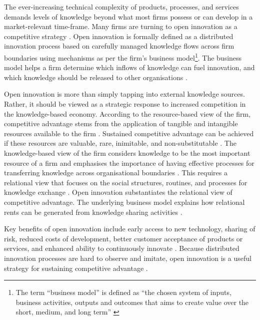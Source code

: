 The ever-increasing technical complexity of products, processes, and services demands levels of knowledge beyond what most firms possess or can develop in a market-relevant time-frame. Many firms are turning to open innovation as a competitive strategy \citep{enkel2009open,bessant2013innovation}. Open innovation is formally defined as a distributed innovation process based on carefully managed knowledge flows across firm boundaries using mechanisms as per the firm's business model\footnote{The term \enquote{business model} is defined as \enquote{the chosen system of inputs, business activities, outputs and outcomes that aims to create value over the short, medium, and long term} \citep{gould2013business}}. The business model helps a firm determine which inflows of knowledge can fuel innovation, and which knowledge should be released to other organisations \citep{chesbrough2017future}. \medskip 

Open innovation is more than simply tapping into external knowledge sources. Rather, it should be viewed as a strategic response to increased competition in the knowledge-based economy. According to the resource-based view of the firm, competitive advantage stems from the application of tangible and intangible resources available to the firm \citep{wernerfelt1984resource,peteraf1993cornerstones}. Sustained competitive advantage can be achieved if these resources are valuable, rare, inimitable, and non-substitutable \citep{barney1991firm}. The knowledge-based view of the firm considers knowledge to be the most important resource of a firm and emphasises the importance of having effective processes for transferring knowledge across organisational boundaries \citep{kogut1992knowledge,grant1996toward}. This requires a relational view that focuses on the social structures, routines, and processes for knowledge exchange \citep{dyer1998relational,na}. Open innovation substantiates the relational view of competitive advantage. The underlying business model explains how relational rents can be generated from knowledge sharing activities \citep{dyer1998relational,lavie2006competitive}. \medskip

Key benefits of open innovation include early access to new technology, sharing of risk, reduced costs of development, better customer acceptance of products or services, and enhanced ability to continuously innovate \citep{ye2013exploring}. Because distributed innovation processes are hard to observe and imitate, open innovation is a useful strategy for sustaining competitive advantage \citep{barney1991firm,lichtenthaler2011open}. \medskip

